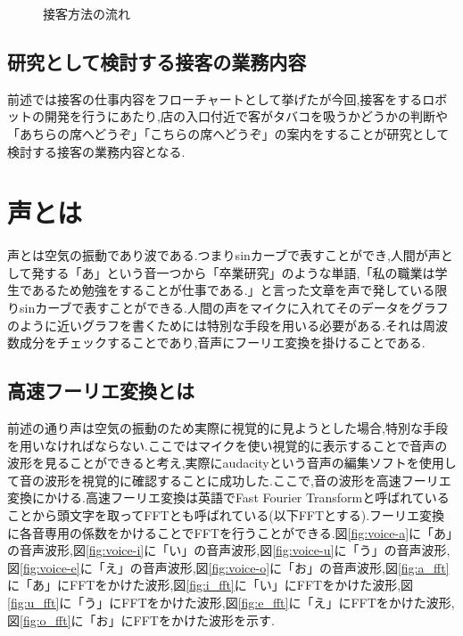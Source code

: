 \documentclass[12pt,oneside]{sotsuken_paper}
\begin{document}
\begin{figure}[htbp]
\scriptsize
{}
%
\caption{接客方法の流れ}
\label{fig:customer-service}%
\normalsize
\end{figure}


\subsection{研究として検討する接客の業務内容}
前述では接客の仕事内容をフローチャートとして挙げたが今回,接客をするロボットの開発を行うにあたり,店の入口付近で客がタバコを吸うかどうかの判断や「あちらの席へどうぞ」「こちらの席へどうぞ」の案内をすることが研究として検討する接客の業務内容となる.


\section{声とは}
声とは空気の振動であり波である.つまりsinカーブで表すことができ,人間が声として発する「あ」という音一つから「卒業研究」のような単語,「私の職業は学生であるため勉強をすることが仕事である.」と言った文章を声で発している限りsinカーブで表すことができる.人間の声をマイクに入れてそのデータをグラフのように近いグラフを書くためには特別な手段を用いる必要がある.それは周波数成分をチェックすることであり,音声にフーリエ変換を掛けることである.


\subsection{高速フーリエ変換とは}
前述の通り声は空気の振動のため実際に視覚的に見ようとした場合,特別な手段を用いなければならない.ここではマイクを使い視覚的に表示することで音声の波形を見ることができると考え,実際にaudacityという音声の編集ソフトを使用して音の波形を視覚的に確認することに成功した.ここで,音の波形を高速フーリエ変換にかける.高速フーリエ変換は英語でFast Fourier Transformと呼ばれていることから頭文字を取ってFFTとも呼ばれている(以下FFTとする).フーリエ変換に各音専用の係数をかけることでFFTを行うことができる.図\ref{fig:voice-a}に「あ」の音声波形,図\ref{fig:voice-i}に「い」の音声波形,図\ref{fig:voice-u}に「う」の音声波形,図\ref{fig:voice-e}に「え」の音声波形,図\ref{fig:voice-o}に「お」の音声波形,図\ref{fig:a_fft}に「あ」にFFTをかけた波形,図\ref{fig:i_fft}に「い」にFFTをかけた波形,図\ref{fig:u_fft}に「う」にFFTをかけた波形,図\ref{fig:e_fft}に「え」にFFTをかけた波形,図\ref{fig:o_fft}に「お」にFFTをかけた波形を示す.
\end{document}
